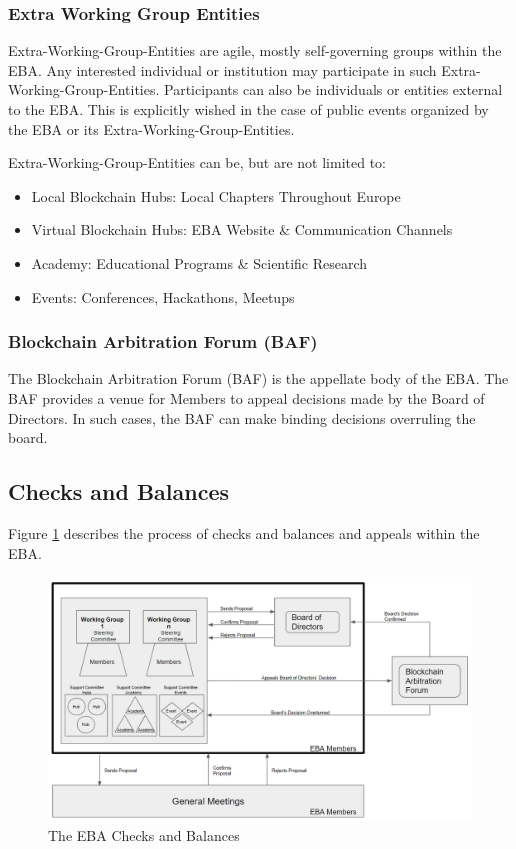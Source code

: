 \documentclass{article}
\begin{document}
\subsubsection{Extra Working Group Entities}

Extra-Working-Group-Entities are agile, mostly self-governing groups within the EBA. 
Any interested individual or institution may participate in such Extra-Working-Group-Entities. 
Participants can also be individuals or entities external to the EBA. 
This is explicitly wished in the case of public events organized by the EBA or its Extra-Working-Group-Entities.

Extra-Working-Group-Entities can be, but are not limited to:

\begin{itemize}
	\item {Local Blockchain Hubs: Local Chapters Throughout Europe}
	\item {Virtual Blockchain Hubs: EBA Website \& Communication Channels}
	\item {Academy: Educational Programs \& Scientific Research}
	\item {Events: Conferences, Hackathons, Meetups}
\end{itemize}

\subsubsection{Blockchain Arbitration Forum (BAF)}

The Blockchain Arbitration Forum (BAF) is the appellate body of the EBA. The BAF provides a venue for Members to appeal decisions made by the Board of Directors. 
In such cases, the BAF can make binding decisions overruling the board.

\subsection{Checks and Balances}

Figure \ref{C_B_Diagram} describes the process of checks and balances and appeals within the EBA. \\

\begin{figure}[h!]
  \includegraphics[width=\textwidth]{images/Governance_Checks_and_Balances.png}
  \caption{The EBA Checks and Balances}
  \label{C_B_Diagram}
\end{figure}
\end{document}
